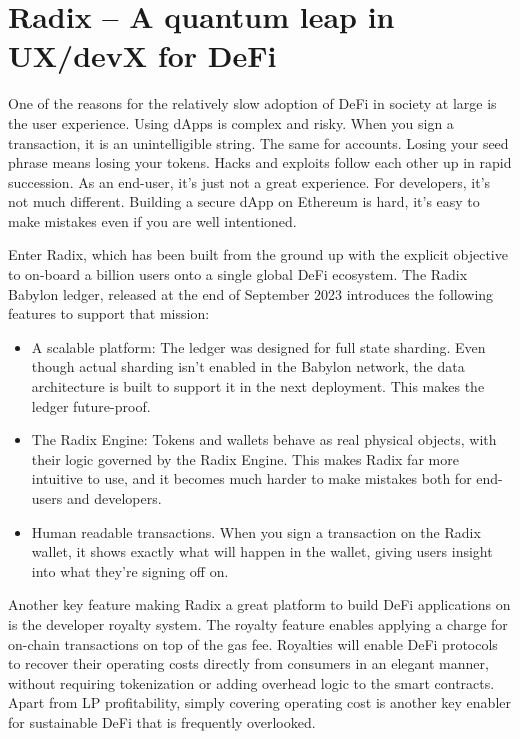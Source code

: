 \documentclass [10pt, twoside] {article}
\begin{document}
\appendix
\section{Radix -- A quantum leap in UX/devX for DeFi}
One of the reasons for the relatively slow adoption of DeFi in society at large is the user experience. Using dApps is complex and risky. When you sign a transaction, it is an unintelligible string. The same for accounts. Losing your seed phrase means losing your tokens. Hacks and exploits follow each other up in rapid succession. As an end-user, it's just not a great experience. For developers, it's not much different. Building a secure dApp on Ethereum is hard, it's easy to make mistakes even if you are well intentioned.

Enter Radix, which has been built from the ground up with the explicit objective to on-board a billion users onto a single global DeFi ecosystem. The Radix Babylon ledger, released at the end of September 2023 introduces the following features to support that mission:
\begin{itemize}
	\item A scalable platform: The ledger was designed for full state sharding. Even though actual sharding isn't enabled in the Babylon network, the data architecture is built to support it in the next deployment. This makes the ledger future-proof.
	\item The Radix Engine: Tokens and wallets behave as real physical objects, with their logic governed by the Radix Engine. This makes Radix far more intuitive to use, and it becomes much harder to make mistakes both for end-users and developers.
	\item Human readable transactions. When you sign a transaction on the Radix wallet, it shows exactly what will happen in the wallet, giving users insight into what they're signing off on.
\end{itemize}
Another key feature making Radix a great platform to build DeFi applications on is the developer royalty system. The royalty feature enables applying a charge for on-chain transactions on top of the gas fee. Royalties will enable DeFi protocols to recover their operating costs directly from consumers in an elegant manner, without requiring tokenization or adding overhead logic to the smart contracts. Apart from LP profitability, simply covering operating cost is another key enabler for sustainable DeFi that is frequently overlooked.


%

%
%


{}
\end{document}

